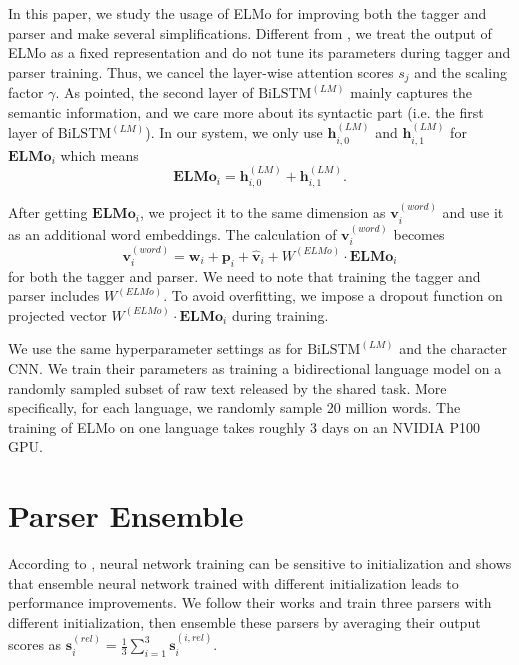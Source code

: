 \documentclass[11pt,a4paper]{article}
\begin{document}
In this paper, we study the usage of ELMo for improving both
the tagger and parser and make several simplifications.
Different from \citet{N18-1202}, we treat the output of ELMo as a fixed representation
and do not tune its parameters during tagger and parser training.
Thus, we cancel the layer-wise attention scores $s_j$ and the scaling factor $\gamma$.
As \citet{N18-1202} pointed, the second layer of $\text{BiLSTM}^{(LM)}$ mainly captures the semantic
information, and we care more about its syntactic part (i.e. the first layer of $\text{BiLSTM}^{(LM)}$).
In our system, we only use $\mathbf{h}_{i, 0}^{(LM)}$ and $\mathbf{h}_{i, 1}^{(LM)}$ for $\mathbf{ELMo}_i$
which means
\[
\mathbf{ELMo}_i = \mathbf{h}_{i, 0}^{(LM)}  +  \mathbf{h}_{i, 1}^{(LM)}.
\]

After getting $\mathbf{ELMo}_i$, we project it
to the same dimension as $\mathbf{v}_i^{(word)}$ and
use it as an additional word embeddings.
The calculation of $\mathbf{v}_i^{(word)}$ becomes
\[
\mathbf{v}_i^{(word)} = \mathbf{w}_i + \mathbf{p}_i + \mathbf{\hat{v}}_i + W^{(ELMo)} \cdot \mathbf{ELMo}_i
\]
for both the tagger and parser.
We need to note that training the tagger and parser includes $W^{(ELMo)}$.
To avoid overfitting, we impose a dropout function on projected vector
$W^{(ELMo)} \cdot \mathbf{ELMo}_i$
during training.

We use the same hyperparameter settings as \citet{N18-1202} for $\text{BiLSTM}^{(LM)}$
and the character CNN.
We train their parameters
as training a bidirectional language model
on a randomly sampled subset of raw text released by the shared task.
More specifically, for each language, we randomly sample 20 million words.
The training of ELMo on one language takes roughly 3 days on an NVIDIA P100 GPU.

\section{Parser Ensemble}\label{sec:ens}

According to \citet{reimers-gurevych:2017:EMNLP2017}, neural network training can
be sensitive to initialization and
\citet{DBLP:journals/corr/abs-1805-11224}  shows that ensemble
neural network trained with different initialization
leads to performance improvements.
We follow their works and train three parsers with different initialization,
then ensemble these parsers by averaging their output scores as 
$\mathbf{s}_i^{(rel)} = \frac{1}{3} \sum_{i=1}^{3} \mathbf{s}_i^{(i, rel)}$.
\end{document}
